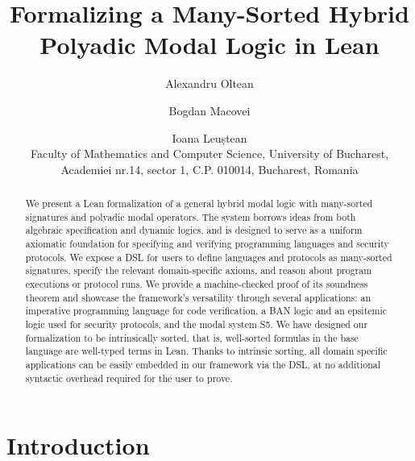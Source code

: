 \documentclass{easychair}
\title{Formalizing a Many-Sorted Hybrid Polyadic Modal Logic in Lean}
\author{
Alexandru Oltean
\and
    Bogdan Macovei
\and
   Ioana Leuștean \\
   {\small Faculty of Mathematics and Computer Science, University of Bucharest,}\\
{\small Academiei nr.14, sector 1, C.P. 010014,  Bucharest, Romania} \\
}
\institute{
  \email{\{andrei-alexandru.oltean, bogdan.macovei, ioana.leustean\}@unibuc.ro}
}
\theoremstyle{remark}
\begin{document}
\maketitle

\begin{abstract}
 We present a Lean formalization of a general hybrid modal logic with many-sorted signatures and polyadic modal operators. The system borrows ideas from both algebraic specification and dynamic logics, and is designed to serve as a uniform axiomatic foundation for specifying and verifying programming languages and security protocols. We expose a DSL for users to define languages and protocols as many-sorted signatures, specify the relevant domain-specific axioms, and reason about program executions or protocol runs. We provide a machine-checked proof of its soundness theorem and showcase the framework's versatility through several applications: an imperative programming language for code verification, a BAN logic and an epsitemic logic used for security protocols, and the modal system S5. We have designed our formalization to be intrinsically sorted, that is, well-sorted formulas in the base language are well-typed terms in Lean. Thanks to intrinsic sorting, all domain specific applications can be easily embedded in our framework via the DSL, at no additional syntactic overhead required for the user to prove.
\end{abstract}

\section{Introduction}\label{introduction}

\end{document}

